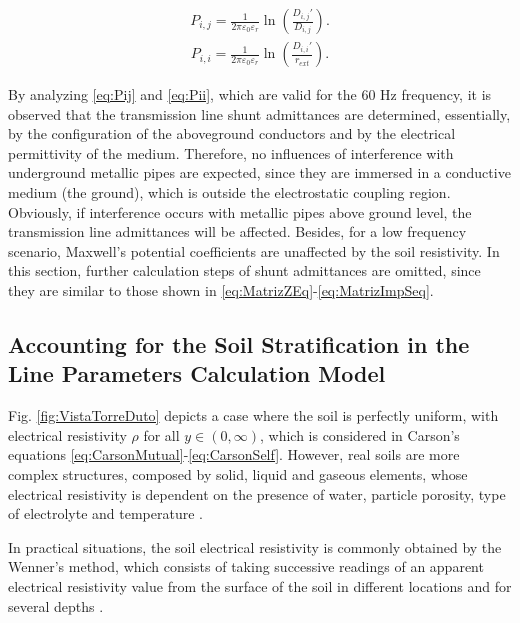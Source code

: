 \documentclass[conference]{IEEEtran}
\begin{document}
	\begin{equation}\label{eq:Pij}
		\begin{aligned}
			P_{i,j}=\frac{1}{2\pi\varepsilon_{0}\varepsilon_{r}}\ln\left(\frac{D_{i,j}'}{D_{i,j}}\right).
		\end{aligned}
	\end{equation}
	\begin{equation}\label{eq:Pii}
		\begin{aligned}
			P_{i,i}=\frac{1}{2\pi\varepsilon_{0}\varepsilon_{r}}\ln\left(\frac{D_{i,i}'}{r_{ext}}\right).
		\end{aligned}
	\end{equation}
	
	By analyzing \eqref{eq:Pij} and \eqref{eq:Pii}, which are valid for the 60 Hz frequency, it is observed that the transmission line shunt admittances are determined, essentially, by the configuration of the aboveground conductors and by the electrical permittivity of the medium. Therefore, no influences of interference with underground metallic pipes are expected, since they are immersed in a conductive medium (the ground), which is outside the electrostatic coupling region. Obviously, if interference occurs with metallic pipes above ground level, the transmission line admittances will be affected. Besides, for a low frequency scenario, Maxwell's potential coefficients are unaffected by the soil resistivity. In this section, further calculation steps of shunt admittances are omitted, since they are similar to those shown in \eqref{eq:MatrizZEq}-\eqref{eq:MatrizImpSeq}.
	
	\subsection{Accounting for the Soil Stratification in the Line Parameters Calculation Model}
	Fig. \ref{fig:VistaTorreDuto} depicts a case where the soil is perfectly uniform, with electrical resistivity $\rho$ for all $y\in(0, \infty)$, which is considered in Carson's equations \eqref{eq:CarsonMutual}-\eqref{eq:CarsonSelf}. However, real soils are more complex structures, composed by solid, liquid and gaseous elements, whose electrical resistivity is dependent on the presence of water, particle porosity, type of electrolyte and temperature \cite{He2012}.
	
	
	In practical situations, the soil electrical resistivity is commonly obtained by the Wenner's method, which consists of taking successive readings of an apparent electrical resistivity value from the surface of the soil in different locations and for several depths \cite{NBR7117}.
	
\end{document}
